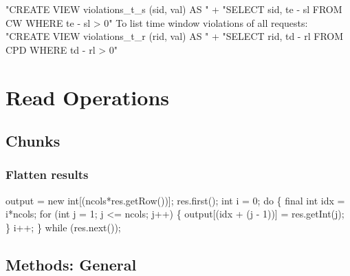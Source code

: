 "CREATE VIEW violations_t_s (sid, val) AS "
  + "SELECT sid, te - sl FROM CW WHERE te - sl > 0"
\nwendcode{}\nwdocspar
To list time window violations of all requests:
\nwenddocs{}\endmoddef{}
"CREATE VIEW violations_t_r (rid, val) AS "
  + "SELECT rid, td - rl FROM CPD WHERE td - rl > 0"
\nwendcode{}\nwdocspar
\nwenddocs{}\chapter{Read Operations}
\label{read}

\section{Chunks}

\subsection{Flatten results}
\nwenddocs{}\endmoddef{}
output = new int[(ncols*res.getRow())];
res.first();
int i = 0;
do \{
  final int idx = i*ncols;
  for (int j = 1; j <= ncols; j++) \{
    output[(idx + (j - 1))] = res.getInt(j);
  \}
  i++;
\} while (res.next());
\nwendcode{}\nwdocspar

\section{Methods: General}

